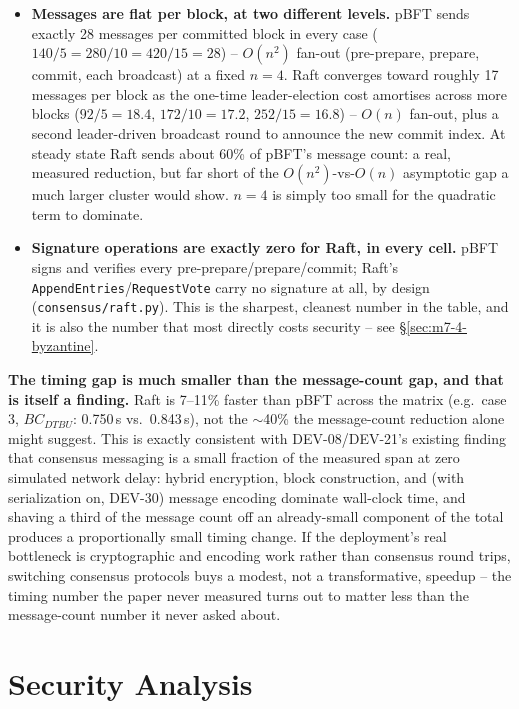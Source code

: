 \documentclass[conference]{IEEEtran}
\begin{document}
\begin{itemize}
\item \textbf{Messages are flat per block, at two different levels.} pBFT sends exactly 28
messages per committed block in every case ($140/5=280/10=420/15=28$) -- $O(n^2)$ fan-out
(pre-prepare, prepare, commit, each broadcast) at a fixed $n=4$. Raft converges toward roughly 17
messages per block as the one-time leader-election cost amortises across more blocks
($92/5=18.4$, $172/10=17.2$, $252/15=16.8$) -- $O(n)$ fan-out, plus a second leader-driven
broadcast round to announce the new commit index. At steady state Raft sends about 60\% of pBFT's
message count: a real, measured reduction, but far short of the $O(n^2)$-vs-$O(n)$ asymptotic gap
a much larger cluster would show. $n=4$ is simply too small for the quadratic term to dominate.
\item \textbf{Signature operations are exactly zero for Raft, in every cell.} pBFT signs and
verifies every pre-prepare/prepare/commit; Raft's \texttt{AppendEntries}/\texttt{RequestVote}
carry no signature at all, by design (\texttt{consensus/raft.py}). This is the sharpest, cleanest
number in the table, and it is also the number that most directly costs security -- see
\S\ref{sec:m7-4-byzantine}.
\end{itemize}

\textbf{The timing gap is much smaller than the message-count gap, and that is itself a finding.}
Raft is 7--11\% faster than pBFT across the matrix (e.g.\ case 3, $BC_{DTBU}$: 0.750\,s vs.\
0.843\,s), not the $\sim$40\% the message-count reduction alone might suggest. This is exactly
consistent with DEV-08/DEV-21's existing finding that consensus messaging is a small fraction of
the measured span at zero simulated network delay: hybrid encryption, block construction, and
(with serialization on, DEV-30) message encoding dominate wall-clock time, and shaving a third of
the message count off an already-small component of the total produces a proportionally small
timing change. If the deployment's real bottleneck is cryptographic and encoding work rather than
consensus round trips, switching consensus protocols buys a modest, not a transformative, speedup
-- the timing number the paper never measured turns out to matter less than the message-count
number it never asked about.

\section{Security Analysis}
\label{sec:security}
\end{document}
